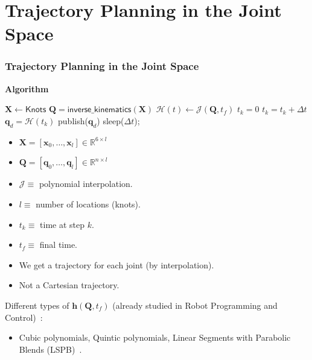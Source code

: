 \documentclass[10pt, aspectratio=169]{beamer}
\theoremstyle{remark}
\theoremstyle{definition}
\begin{document}
\section{Trajectory Planning in the Joint Space}
\begin{frame}[allowframebreaks]
\frametitle{Trajectory Planning in the Joint Space}

\textbf{\textcolor{uma_blue_dark}{Algorithm}}

\begin{minipage}[T!]{.48\linewidth}
\begin{algorithm}[H]
	$\mathbf{X} \gets \textsf{Knots}$\;
    $\mathbf{Q} = \textsf{inverse\_kinematics}(\mathbf{X})$\;
    $\mathcal{H}(t) \gets \mathcal{J}(\mathbf{Q}, t_f)$\;
    $t_k = 0$\;
 	{
        $t_k = t_k + \Delta t$\;
        $\mathbf{q}_{d} = \mathcal{H}(t_k)$\;
        publish($\mathbf{q}_{d}$)\;
        sleep($\Delta t$);
  	}
\end{algorithm}
\end{minipage}
\begin{minipage}[T!]{.42\linewidth}
\begin{itemize}
    \item $\mathbf{X} = [\mathbf{x}_0, \dots, \mathbf{x}_l]\in\mathbb{R}^{6 \times l}$
    \item $\mathbf{Q} = [\mathbf{q}_0, \dots, \mathbf{q}_l]\in\mathbb{R}^{n \times l}$
    \item $\mathcal{J}\equiv$ polynomial interpolation.
    \item $l \equiv$ number of locations (knots).
    \item $t_k \equiv$ time at step $k$.
    \item $t_f \equiv$ final time.
    \item We get a trajectory for each joint (by interpolation).
    \item Not a Cartesian trajectory.
\end{itemize}
\end{minipage}

Different types of $\boldsymbol{h}(\mathbf{Q}, t_f)$ (already studied in Robot Programming and Control)~\cite{joint_trajectory_planning}:
\begin{itemize}
    \item Cubic polynomials, Quintic polynomials, Linear Segments with Parabolic Blends (LSPB)~\cite{point_to_point}.
\end{itemize}


\end{frame}
\end{document}
